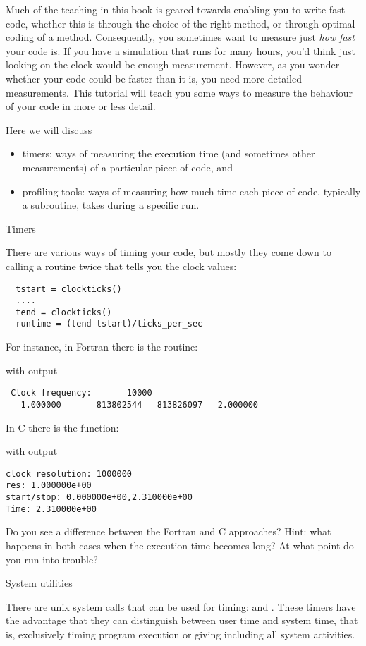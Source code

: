 Much of the teaching in this book is geared towards enabling you to
write fast code, whether this is through the choice of the right
method, or through optimal coding of a method. Consequently, you
sometimes want to measure just \emph{how fast} your code is. If you
have a simulation that runs for many hours, you'd think just looking
on the clock would be enough measurement. However, as you wonder
whether your code could be faster than it is, you need more detailed
measurements. This tutorial will teach you some ways to measure the
behaviour of your code in more or less detail.

Here we will discuss 
\begin{itemize}
\item timers: ways of measuring the execution time (and sometimes
  other measurements) of a particular piece of code, and
\item profiling tools: ways of measuring how much time each piece of
  code, typically a subroutine, takes during a specific run.
\end{itemize}

 {Timers}

There are various ways of timing your code, but mostly they come down
to calling a routine twice that tells you the clock values:
\begin{verbatim}
  tstart = clockticks()
  ....
  tend = clockticks()
  runtime = (tend-tstart)/ticks_per_sec
\end{verbatim}
For instance, in Fortran there is the 
routine:

with output
\begin{verbatim}
 Clock frequency:       10000
   1.000000       813802544   813826097   2.000000  
\end{verbatim}
In C there is the  function:

with output
\begin{verbatim}
clock resolution: 1000000
res: 1.000000e+00
start/stop: 0.000000e+00,2.310000e+00
Time: 2.310000e+00
\end{verbatim}
Do you see a difference between the Fortran and C approaches? Hint:
what happens in both cases when the execution time becomes long? At
what point do you run into trouble?

 {System utilities}

There are unix system calls that can be used for timing: 
and . These timers have the advantage that they can
distinguish between user time and system time, that is, exclusively
timing program execution or giving 
including all system activities.

